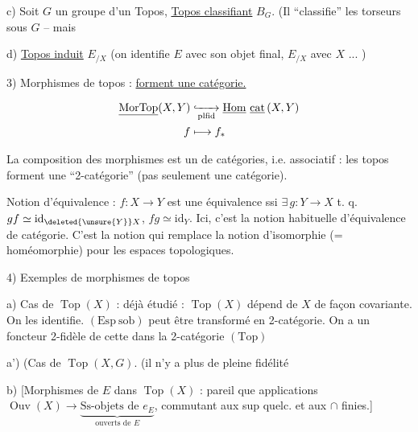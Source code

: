 c) Soit $G$ un groupe d'un Topos, \uline{Topos classifiant} $B_G$. (Il ``classifie'' les torseurs sous $G$ -- mais


 d) \uline{Topos induit} $E_{/X}$ (on identifie  $E$ avec son objet final, $E_{/X}$ avec $X$ ... )


3) Morphismes de topos : \uline{forment une catégorie.}

\[\begin{aligned}\underline{\mathrm{MorTop}}(X,Y)&\lhook\joinrel\xrightarrow[\mathrm{plfid}]{}\underline{\mathrm{Hom}}\ \underline{\mathrm{cat}}\,(X,Y)\\ f&\longmapsto f_*\end{aligned}\]


La composition des morphismes est un   de catégories, i.e. associatif : les topos forment une ``2-catégorie'' (pas seulement une catégorie).


Notion d'équivalence  : $f:X\to Y$ est une équivalence ssi $\exists\,g:Y\to X$ t. q. $gf\simeq\mathrm{id}_{\deleted{\unsure{Y}}X}$, $fg\simeq\mathrm{id}_Y$. Ici, c'est la notion habituelle d'équivalence de catégorie. C'est la notion qui remplace la notion d'isomorphie (= homéomorphie) pour les espaces topologiques.

4) Exemples de morphismes de topos

a) Cas de $\operatorname{Top}(X)$ : déjà étudié : $\operatorname{Top}(X)$ dépend de $X$ de façon covariante. On les identifie. $(\mathrm{Esp\ sob})$ \deleted{\unsure{$\to$}} peut être transformé en 2-catégorie. On a un foncteur 2-fidèle de cette  dans la 2-catégorie $(\mathrm{Top})$

a') (Cas de $\operatorname{Top}(X,G)$.  (il n'y a plus de pleine fidélité

b) [Morphismes de $E$ dans $\operatorname{Top}(X)$ : pareil que  applications $\operatorname{Ouv}(X)\longrightarrow\underbrace{\text{Ss-objets de }e_E}_{\text{ouverts de }E}$, commutant aux sup quelc. et aux $\cap$ finies.]

